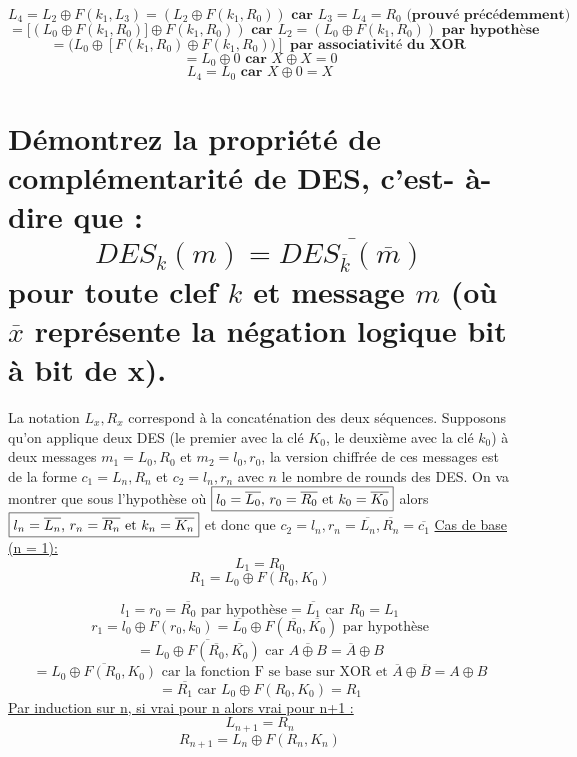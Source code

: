 \documentclass[fleqn]{article}
\begin{document}
\[L_4 = L_2 \oplus F(k_1, L_3) = (L_2 \oplus F(k_1, R_0)) \textbf{ car } L_3 = L_4 = R_0 \textbf{ (prouvé précédemment)}\]
\[= [(L_0 \oplus F(k_1, R_0)] \oplus F(k_1, R_0)) \textbf{ car } L_2 = (L_0 \oplus F(k_1, R_0)) \textbf{ par hypothèse}\]
\[= (L_0 \oplus [F(k_1, R_0) \oplus F(k_1, R_0))] \textbf{ par associativité du XOR }\]
\[= L_0 \oplus 0 \textbf{ car } X \oplus X = 0\]
\[\boxed{L_4 = L_0} \textbf{ car } X \oplus 0 = X\]

\section{\normalsize  D\'{e}montrez la propri\'{e}t\'{e} de compl\'{e}mentarit\'{e} de DES, c'est- \`{a}-dire que :
$$
DES_{k}(m)=\overline{DES_{\overline{k}}(\overline{m})}
$$
pour toute clef $k$ et message $m$ (o\`{u} $\overline{x}$ repr\'{e}sente la n\'{e}gation logique bit \`{a} bit de x).}

La notation $L_x, R_x$ correspond à la concaténation des deux séquences.\newline\newline
Supposons qu'on applique deux DES (le premier avec la clé $K_0$, le deuxième avec la clé $k_0$) à deux messages $m_1 =  L_0, R_0$ et $m_2 =  l_0, r_0$, la version chiffrée de ces messages est de la forme $c_1 =  L_n, R_n$ et $c_2 =  l_n, r_n$ avec $n$ le nombre de rounds des DES.\newline\newline
On va montrer que sous l'hypothèse où $\boxed{l_0 = \overline{L_0}$, $r_0 = \overline{R_0}$ et $k_0 = \overline{K_0}}$ alors $\boxed{l_n = \overline{L_n}$, $r_n = \overline{R_n}$ et $k_n = \overline{K_n}}$ et donc que $c_2 = l_n, r_n = \overline{L_n}, \overline{R_n} = \overline{c_1}$
\newline\newline
\underline{Cas de base (n = 1):}\newline
\[L_1 = R_0\]
\[R_1 = L_0 \oplus F(R_0, K_0)\]

\[l_1 = r_0 = \overline{R_0} \text{ par hypothèse} = \boxed{\overline{L_1}} \text{ car } R_0 = L_1\] 
\[r_1 = l_0 \oplus F(r_0, k_0) = \overline{L_0} \oplus F(\overline{R_0}, \overline{K_0}) \text{ par hypothèse}\]
\[= \overline{L_0 \oplus F(\overline{R_0}, \overline{K_0})} \text{ car } \overline{A \oplus B} = \overline{A} \oplus B\]
\[= \overline{L_0 \oplus F(R_0, K_0)} \text{ car la fonction F se base sur XOR et } \overline{A} \oplus \overline{B} = A \oplus B\]
\[= \boxed{\overline{R_1}} \text{ car } L_0 \oplus F(R_0, K_0) = R_1\]
\newline\newline
\underline{Par induction sur n, si vrai pour n alors vrai pour n+1 :}\newline
\[L_{n+1} = R_n\]
\[R_{n+1} = L_n \oplus F(R_n, K_n)\]
\end{document}
